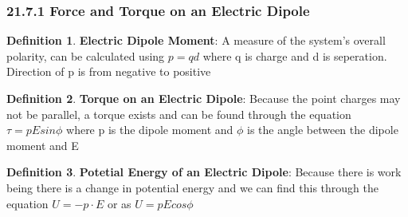 \documentclass[12pt]{amsart}
\theoremstyle{definition}
\newtheorem{definition}{Definition} %
\numberwithin{equation}{theorem}    %
\begin{document}
\subsubsection*{21.7.1 Force and Torque on an Electric Dipole}

\begin{definition}
    \textbf{Electric Dipole Moment}: A measure of the system's overall polarity,
    can be calculated using $ p = qd$ where q is charge and d is seperation.
    Direction of p is from negative to positive
\end{definition}

\begin{definition}
    \textbf{Torque on an Electric Dipole}: Because the point charges may not be
    parallel, a torque exists and can be found through the equation $\tau = pEsin\phi$
    where p is the dipole moment and $\phi$ is the angle between the dipole moment and E
\end{definition}

\begin{definition}
    \textbf{Potetial Energy of an Electric Dipole}: Because there is work being
    there is a change in potential energy and we can find this through the equation
    $U =-p\cdot E$ or as $U = pEcos\phi$ 
\end{definition}
\end{document}
